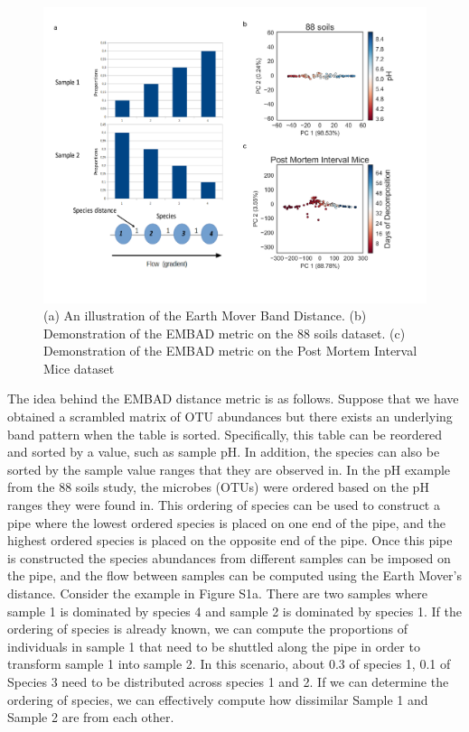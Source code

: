 \begin{figure}[H]
        \centering
        \includegraphics[width=1\textwidth]{appendix_a/FigureS1.pdf}
        \caption[An illustration of a distance metric that is engineered not to saturate.]{(a) An illustration of the Earth Mover Band Distance.  (b)  Demonstration of the EMBAD metric on the 88 soils dataset.
          (c) Demonstration of the EMBAD metric on the Post Mortem Interval Mice dataset}
        \label{figaS1}
\end{figure}

The idea behind the EMBAD distance metric is as follows.  Suppose that we have obtained a scrambled matrix of OTU abundances but there exists an underlying band pattern when the table is sorted.  Specifically, this table can be reordered and sorted by a value, such as sample pH.  In addition, the species can also be sorted by the sample value ranges that they are observed in.  In the pH example from the 88 soils study, the microbes (OTUs) were ordered based on the pH ranges they were found in.  This ordering of species can be used to construct a pipe where the lowest ordered species is placed on one end of the pipe, and the highest ordered species is placed on the opposite end of the pipe.  Once this pipe is constructed the species abundances from different samples can be imposed on the pipe, and the flow between samples can be computed using the Earth Mover’s distance.  Consider the example in Figure S1a.  There are two samples where sample 1 is dominated by species 4 and sample 2 is dominated by species 1.  If the ordering of species is already known, we can compute the proportions of individuals in sample 1 that need to be shuttled along the pipe in order to transform sample 1 into sample 2.  In this scenario, about 0.3 of species 1, 0.1 of Species 3 need to be distributed across species 1 and 2.  If we can determine the ordering of species, we can effectively compute how dissimilar Sample 1 and Sample 2 are from each other.

